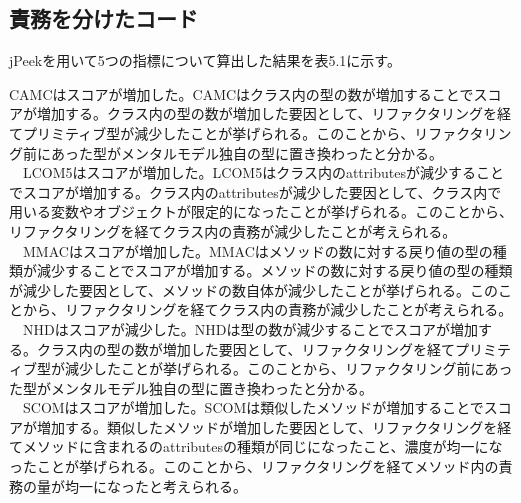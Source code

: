 \documentclass[12pt, a4paper]{jreport}
\begin{document}
\subsection{責務を分けたコード}
jPeekを用いて5つの指標について算出した結果を表5.1に示す。
\begin{table}[H]
\centering
\caption{jPeekによる算出結果}
\label{ttt}
\end{table}
CAMCはスコアが増加した。CAMCはクラス内の型の数が増加することでスコアが増加する。クラス内の型の数が増加した要因として、リファクタリングを経てプリミティブ型が減少したことが挙げられる。このことから、リファクタリング前にあった型がメンタルモデル独自の型に置き換わったと分かる。
\\　LCOM5はスコアが増加した。LCOM5はクラス内のattributesが減少することでスコアが増加する。クラス内のattributesが減少した要因として、クラス内で用いる変数やオブジェクトが限定的になったことが挙げられる。このことから、リファクタリングを経てクラス内の責務が減少したことが考えられる。
\\　MMACはスコアが増加した。MMACはメソッドの数に対する戻り値の型の種類が減少することでスコアが増加する。メソッドの数に対する戻り値の型の種類が減少した要因として、メソッドの数自体が減少したことが挙げられる。このことから、リファクタリングを経てクラス内の責務が減少したことが考えられる。
\\　NHDはスコアが減少した。NHDは型の数が減少することでスコアが増加する。クラス内の型の数が増加した要因として、リファクタリングを経てプリミティブ型が減少したことが挙げられる。このことから、リファクタリング前にあった型がメンタルモデル独自の型に置き換わったと分かる。
\\　SCOMはスコアが増加した。SCOMは類似したメソッドが増加することでスコアが増加する。類似したメソッドが増加した要因として、リファクタリングを経てメソッドに含まれるのattributesの種類が同じになったこと、濃度が均一になったことが挙げられる。このことから、リファクタリングを経てメソッド内の責務の量が均一になったと考えられる。
\end{document}
